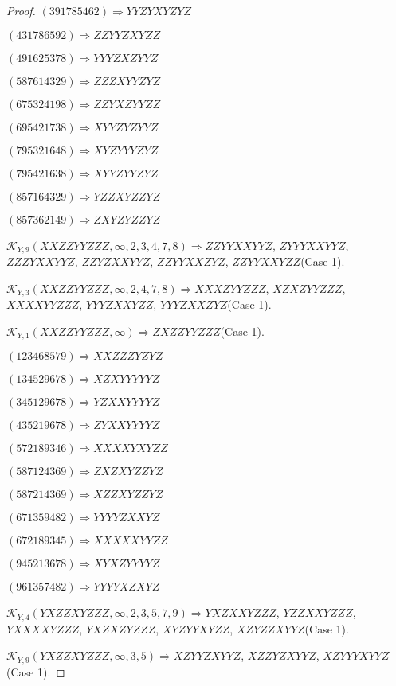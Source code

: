 \documentclass[12pt]{article}
\theoremstyle{plain}
\theoremstyle{definition}
\theoremstyle{remark}
\newcommand{\fancy}[1]{\mathcal{#1}}
\def\K{\fancy{K}}
\begin{document}
\begin{proof}
	$(3 9 1 7 8 5 4 6 2)\Rightarrow YYZYXYZYZ$
	
	$(4 3 1 7 8 6 5 9 2)\Rightarrow ZZYYZXYZZ$
	
	$(4 9 1 6 2 5 3 7 8)\Rightarrow YYYZXZYYZ$
	
	$(5 8 7 6 1 4 3 2 9)\Rightarrow ZZZXYYZYZ$
	
	$(6 7 5 3 2 4 1 9 8)\Rightarrow ZZYXZYYZZ$
	
	$(6 9 5 4 2 1 7 3 8)\Rightarrow XYYZYZYYZ$
	
	$(7 9 5 3 2 1 6 4 8)\Rightarrow XYZYYYZYZ$
	
	$(7 9 5 4 2 1 6 3 8)\Rightarrow XYYZYYZYZ$
	
	$(8 5 7 1 6 4 3 2 9)\Rightarrow YZZXYZZYZ$
	
	$(8 5 7 3 6 2 1 4 9)\Rightarrow ZXYZYZZYZ$
	
	
	
	$\K_{Y,9}(XXZZYYZZZ,\infty,2, 3, 4, 7, 8)\Rightarrow $$ZZYYXXYYZ$, $ZYYYXXYYZ$, $ZZZYXXYYZ$, $ZZYZXXYYZ$, $ZZYYXXZYZ$, $ZZYYXXYZZ$(Case 1).
	
	$\K_{Y,3}(XXZZYYZZZ,\infty,2, 4, 7, 8)\Rightarrow $$XXXZYYZZZ$, $XZXZYYZZZ$, $XXXXYYZZZ$, $YYYZXXYZZ$, $YYYZXXZYZ$(Case 1).
	
	$\K_{Y,1}(XXZZYYZZZ,\infty)\Rightarrow $$ZXZZYYZZZ$(Case 1).
	
	
	
	$(1 2 3 4 6 8 5 7 9)\Rightarrow XXZZZYZYZ$
	
	$(1 3 4 5 2 9 6 7 8)\Rightarrow XZXYYYYYZ$
	
	$(3 4 5 1 2 9 6 7 8)\Rightarrow YZXXYYYYZ$
	
	$(4 3 5 2 1 9 6 7 8)\Rightarrow ZYXXYYYYZ$
	
	$(5 7 2 1 8 9 3 4 6)\Rightarrow XXXXYXYZZ$
	
	$(5 8 7 1 2 4 3 6 9)\Rightarrow ZXZXYZZYZ$
	
	$(5 8 7 2 1 4 3 6 9)\Rightarrow XZZXYZZYZ$
	
	$(6 7 1 3 5 9 4 8 2)\Rightarrow YYYYZXXYZ$
	
	$(6 7 2 1 8 9 3 4 5)\Rightarrow XXXXXYYZZ$
	
	$(9 4 5 2 1 3 6 7 8)\Rightarrow XYXZYYYYZ$
	
	$(9 6 1 3 5 7 4 8 2)\Rightarrow YYYYXZXYZ$
	
	
	
	$\K_{Y,4}(YXZZXYZZZ,\infty,2, 3, 5, 7, 9)\Rightarrow $$YXZXXYZZZ$, $YZZXXYZZZ$, $YXXXXYZZZ$, $YXZXZYZZZ$, $XYZYYXYZZ$, $XZYZZXYYZ$(Case 1).
	
	$\K_{Y,9}(YXZZXYZZZ,\infty,3, 5)\Rightarrow $$XZYYZXYYZ$, $XZZYZXYYZ$, $XZYYYXYYZ$(Case 1).
	

\end{proof}
\end{document}
